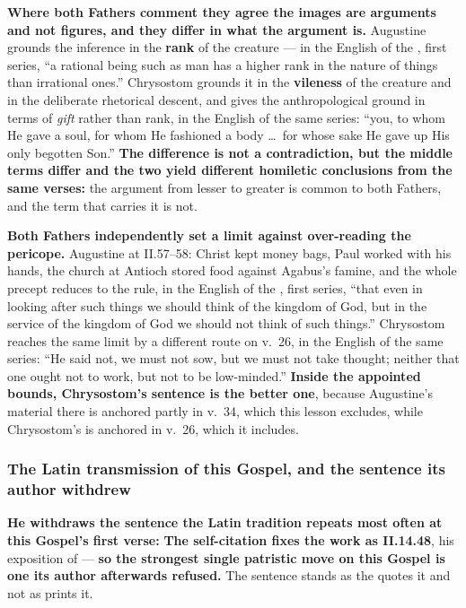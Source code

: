 \textbf{Where both Fathers comment they agree the images are arguments and not
figures, and they differ in what the argument is.} Augustine grounds the
inference in the \textbf{rank} of the creature --- in the English of the
, first series, ``a rational being such as
man has a higher rank in the nature of things than irrational ones.'' Chrysostom
grounds it in the \textbf{vileness} of the creature and in the deliberate
rhetorical descent, and gives the anthropological ground in terms of \emph{gift}
rather than rank, in the English of the same series: ``you, to whom He gave a
soul, for whom He fashioned a body
\dots\ for whose sake He gave up His only begotten Son.'' \textbf{The difference
is not a contradiction, but the middle terms differ and the two yield different
homiletic conclusions from the same verses:} the argument from lesser to greater
is common to both Fathers, and the term that carries it is not.

\textbf{Both Fathers independently set a limit against over-reading the
pericope.} Augustine at II.57--58: Christ kept money bags, Paul worked with his
hands, the church at Antioch stored food against Agabus's famine, and the whole
precept reduces to the rule, in the English of the , first series, ``that even in looking after such things we should
think of the kingdom of God, but in the service of the kingdom of God we should
not think of such things.'' Chrysostom reaches the same limit by a different
route on v.~26, in the English of the same series: ``He said not, we must not
sow, but we must not take thought;
neither that one ought not to work, but not to be low-minded.'' \textbf{Inside the
appointed bounds, Chrysostom's sentence is the better one}, because Augustine's material there is anchored partly in v.~34, which this
lesson excludes, while Chrysostom's is anchored in v.~26, which it includes.

\subsubsection*{The Latin transmission of this Gospel, and the sentence its author withdrew}

\begin{witnessnote}
 \textbf{He withdraws the sentence the Latin tradition repeats most often at this
Gospel's first verse:} 
\textbf{The self-citation fixes the work as 
II.14.48}, his exposition of 
--- \textbf{so the strongest single patristic move on this Gospel is one its
author afterwards refused.} The sentence stands as the  quotes
it and not as  prints it.
\end{witnessnote}

